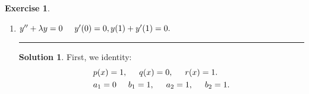 \documentclass{article}
\theoremstyle{definition}
\newtheorem*{exer*}{Exercise}
\newtheorem*{sln*}{Solution}
\begin{document}
\begin{exer*}
\begin{enumerate}
		\newpage
		
		
		\item $y'' + \lambda y = 0\hspace{0.5cm} y'(0) = 0, y(1) + y'(1) = 0. $\\
		\noindent\rule{\textwidth}{0.5pt}
		\begin{sln*}
			First, we identity:
			\begin{align*}
			&p(x) = 1,\hspace{0.5cm} q(x) = 0,\hspace{0.5cm} r(x) = 1.\\
			&a_1 = 0\hspace{0.5cm} b_1 = 1,\hspace{0.5cm}a_2 = 1,\hspace{0.5cm} b_2 = 1.
			\end{align*}
			

\end{sln*}
\end{enumerate}
\end{exer*}
\end{document}

